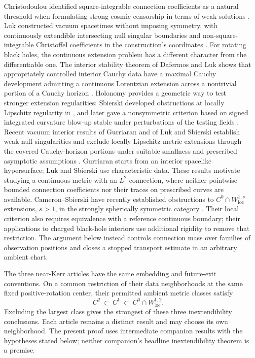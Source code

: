 Christodoulou identified square-integrable connection coefficients as
a natural threshold when formulating strong cosmic censorship in
terms of weak solutions \cite[p.~9]{Christodoulou2009}.
Luk constructed vacuum spacetimes without imposing symmetry, with continuously
extendible intersecting null singular boundaries and non-square-integrable
Christoffel coefficients in the construction's coordinates \cite{Luk2018}.
For rotating black holes, the continuous extension problem has a
different character from the differentiable one. The interior
stability theorem of Dafermos and Luk shows that appropriately controlled
interior Cauchy data have a maximal Cauchy development admitting a
continuous Lorentzian extension across a nontrivial portion of a Cauchy horizon
\cite{DafermosLuk2025}. Holonomy provides a geometric way to test
stronger extension regularities: Sbierski developed obstructions at
locally Lipschitz regularity in \cite{Sbierski2022}, and later
gave a nonsymmetric criterion based on signed integrated curvature
blow-up stable under perturbations of the testing fields \cite[Theorem~3.14]{Sbierski2026}. Recent
vacuum interior results of Gurriaran and of Luk and Sbierski
establish weak null singularities and exclude locally Lipschitz metric
extensions through the covered Cauchy-horizon portions under suitable
smallness and prescribed asymptotic assumptions
\cite{Gurriaran2026,LukSbierski2026}. Gurriaran starts from an
interior spacelike hypersurface; Luk and Sbierski use
characteristic data. These results motivate studying a
continuous metric with an
$L^2$ connection, where neither pointwise bounded connection
coefficients nor their traces on prescribed curves are available.
Cameron--Sbierski have recently established obstructions to
$C^0\cap W^{1,s}_{\mathrm{loc}}$ extensions, $s>1$, in the strongly
spherically symmetric category \cite{CameronSbierski2026Ls}. Their local
criterion also requires equivalence with a reference continuous
boundary; their applications to charged black-hole interiors use
additional rigidity to remove that restriction. The argument below
instead controls connection mass over families of observation positions
and closes a stopped transport estimate in an arbitrary ambient chart.

The three near-Kerr articles have the same embedding and future-exit
conventions. On a common restriction of their data neighborhoods at
the same fixed positive-rotation center, their permitted ambient metric classes satisfy
\[
 C^2\ \subset\ C^1\ \subset\
 C^0\cap W^{1,2}_{\mathrm{loc}}.
\]
Excluding the largest class gives the strongest of these three
inextendibility conclusions. Each article remains a distinct result and
may choose its own neighborhood. The present proof uses intermediate
companion results with the hypotheses stated below; neither companion's
headline inextendibility theorem is a premise.

